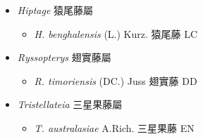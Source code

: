 
  \begin{itemize}
 \item[] \textit{Hiptage} 猿尾藤屬
                                
  \begin{itemize}
        \item[] \textit{H. benghalensis} (L.) Kurz.  猿尾藤   LC
  \end{itemize}
 \item[] \textit{Ryssopterys} 翅實藤屬
                                
  \begin{itemize}
        \item[] \textit{R. timoriensis} (DC.) Juss  翅實藤   DD
  \end{itemize}
 \item[] \textit{Tristellateia} 三星果藤屬
                                
  \begin{itemize}
        \item[] \textit{T. australasiae} A.Rich.  三星果藤   EN
  \end{itemize}
  \end{itemize}
